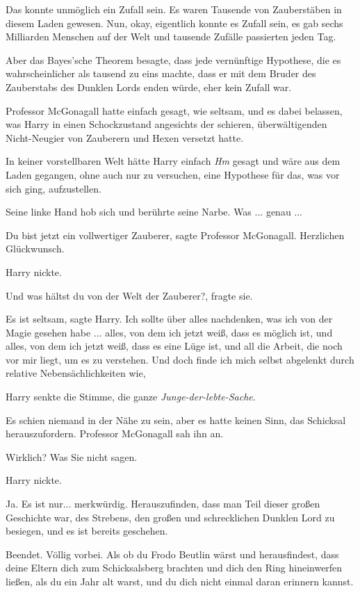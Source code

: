 Das konnte unmöglich ein Zufall sein. Es waren Tausende von Zauberstäben in
diesem Laden gewesen. Nun, okay, eigentlich konnte es Zufall sein, es gab sechs
Milliarden Menschen auf der Welt und tausende Zufälle passierten jeden Tag.

Aber das Bayes'sche Theorem besagte, dass jede vernünftige Hypothese, die es
wahrscheinlicher als tausend zu eins machte, dass er mit dem Bruder des
Zauberstabs des Dunklen Lords enden würde, eher kein Zufall war.

Professor McGonagall hatte einfach gesagt, wie seltsam, und es dabei belassen,
was Harry in einen Schockzustand angesichts der schieren, überwältigenden
Nicht-Neugier von Zauberern und Hexen versetzt hatte.

In keiner vorstellbaren Welt hätte Harry einfach \glqq \emph{Hm}\grqq{} gesagt
und wäre aus dem Laden gegangen, ohne auch nur zu versuchen, eine Hypothese für
das, was vor sich ging, aufzustellen.

Seine linke Hand hob sich und berührte seine Narbe. Was ... genau ...

\glqq Du bist jetzt ein vollwertiger Zauberer\grqq{}, sagte Professor
McGonagall. \glqq Herzlichen Glückwunsch.\grqq{}

Harry nickte.

\glqq Und was hältst du von der Welt der Zauberer?\grqq{}, fragte sie.

\glqq Es ist seltsam\grqq{}, sagte Harry. \glqq Ich sollte über alles
nachdenken, was ich von der Magie gesehen habe ... alles, von dem ich jetzt
weiß, dass es möglich ist, und alles, von dem ich jetzt weiß, dass es eine Lüge
ist, und all die Arbeit, die noch vor mir liegt, um es zu verstehen. Und doch
finde ich mich selbst abgelenkt durch relative Nebensächlichkeiten wie\grqq{},

Harry senkte die Stimme, \glqq die ganze \emph{Junge-der-lebte-Sache}.\grqq{}

Es schien niemand in der Nähe zu sein, aber es hatte keinen Sinn, das Schicksal
herauszufordern. Professor McGonagall sah ihn an.

\glqq Wirklich? Was Sie nicht sagen.\grqq{}

Harry nickte.

\glqq Ja. Es ist nur... merkwürdig. Herauszufinden, dass man Teil dieser großen
Geschichte war, des Strebens, den großen und schrecklichen Dunklen Lord zu
besiegen, und es ist bereits geschehen.

Beendet. Völlig vorbei. Als ob du Frodo Beutlin wärst und herausfindest, dass
deine Eltern dich zum Schicksalsberg brachten und dich den Ring hineinwerfen
ließen, als du ein Jahr alt warst, und du dich nicht einmal daran erinnern
kannst.\grqq{}

